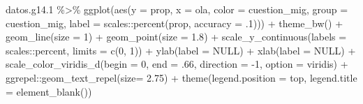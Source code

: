 \documentclass[
  12pt,
]{book}
\newenvironment{Shaded}{\begin{snugshade}}{\end{snugshade}}
\newcommand{\AttributeTok}[1]{\textcolor[rgb]{0.77,0.63,0.00}{#1}}
\newcommand{\ConstantTok}[1]{\textcolor[rgb]{0.00,0.00,0.00}{#1}}
\newcommand{\DecValTok}[1]{\textcolor[rgb]{0.00,0.00,0.81}{#1}}
\newcommand{\FloatTok}[1]{\textcolor[rgb]{0.00,0.00,0.81}{#1}}
\newcommand{\FunctionTok}[1]{\textcolor[rgb]{0.00,0.00,0.00}{#1}}
\newcommand{\NormalTok}[1]{#1}
\newcommand{\SpecialCharTok}[1]{\textcolor[rgb]{0.00,0.00,0.00}{#1}}
\newcommand{\StringTok}[1]{\textcolor[rgb]{0.31,0.60,0.02}{#1}}
\begin{document}
\begin{Shaded}
\begin{Highlighting}[]
\NormalTok{datos.g14}\FloatTok{.1} \SpecialCharTok{\%\textgreater{}\%} 
  \FunctionTok{ggplot}\NormalTok{(}\FunctionTok{aes}\NormalTok{(}\AttributeTok{y =}\NormalTok{ prop, }\AttributeTok{x =}\NormalTok{ ola, }\AttributeTok{color =}\NormalTok{ cuestion\_mig, }\AttributeTok{group =}\NormalTok{ cuestion\_mig,}
             \AttributeTok{label =}\NormalTok{ scales}\SpecialCharTok{::}\FunctionTok{percent}\NormalTok{(prop, }\AttributeTok{accuracy =}\NormalTok{ .}\DecValTok{1}\NormalTok{))) }\SpecialCharTok{+}
  \FunctionTok{theme\_bw}\NormalTok{() }\SpecialCharTok{+}   
  \FunctionTok{geom\_line}\NormalTok{(}\AttributeTok{size =} \DecValTok{1}\NormalTok{) }\SpecialCharTok{+}
  \FunctionTok{geom\_point}\NormalTok{(}\AttributeTok{size =} \FloatTok{1.8}\NormalTok{) }\SpecialCharTok{+}
  \FunctionTok{scale\_y\_continuous}\NormalTok{(}\AttributeTok{labels =}\NormalTok{ scales}\SpecialCharTok{::}\NormalTok{percent,}
                     \AttributeTok{limits =} \FunctionTok{c}\NormalTok{(}\DecValTok{0}\NormalTok{, }\DecValTok{1}\NormalTok{)) }\SpecialCharTok{+}
  \FunctionTok{ylab}\NormalTok{(}\AttributeTok{label =} \ConstantTok{NULL}\NormalTok{) }\SpecialCharTok{+}
  \FunctionTok{xlab}\NormalTok{(}\AttributeTok{label =} \ConstantTok{NULL}\NormalTok{) }\SpecialCharTok{+}
  \FunctionTok{scale\_color\_viridis\_d}\NormalTok{(}\AttributeTok{begin =} \DecValTok{0}\NormalTok{, }\AttributeTok{end =}\NormalTok{ .}\DecValTok{66}\NormalTok{, }\AttributeTok{direction =} \SpecialCharTok{{-}}\DecValTok{1}\NormalTok{, }\AttributeTok{option =} \StringTok{\textquotesingle{}viridis\textquotesingle{}}\NormalTok{) }\SpecialCharTok{+}
\NormalTok{  ggrepel}\SpecialCharTok{::}\FunctionTok{geom\_text\_repel}\NormalTok{(}\AttributeTok{size=} \FloatTok{2.75}\NormalTok{) }\SpecialCharTok{+}
  \FunctionTok{theme}\NormalTok{(}\AttributeTok{legend.position =} \StringTok{\textquotesingle{}top\textquotesingle{}}\NormalTok{,}
        \AttributeTok{legend.title =} \FunctionTok{element\_blank}\NormalTok{())}
\end{Highlighting}
\end{Shaded}
\end{document}
